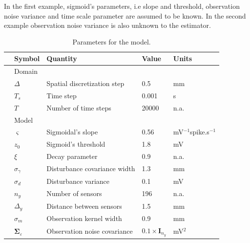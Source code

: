 \documentclass[10pt,twocolumn,twoside]{IEEEtran}
\begin{document}
In the first example, sigmoid's parameters, i.e slope and threshold, observation noise variance and time scale parameter are assumed to be known. In the second example observation noise variance is also unknown to the estimator.

\begin {table}[t]
\begin{center}
	{\tiny\begin{tabular}{lllll}
	\hline \hline
	& Symbol & Quantity &Value& Units\\ 
	\hline 
	& Domain&&& \\
	& $\Delta$ &Spatial discretization step&0.5&mm \\ 
 	& $T_s$ &Time step&0.001&s \\ 
 	& $T$ &Number of time steps&20000&n.a. \\ 
 	&Model&&& \\
 	& $\varsigma$ &Sigmoidal's slope&0.56&mV$^{-1}$spike.s$^{-1}$ \\ 
 	& $z_0$ &Sigmoid's threshold &1.8&mV \\ 
 	& $\xi$ &Decay parameter&0.9 &n.a. \\  
  & $\sigma_{\gamma}$ &Disturbance covariance width&1.3 &mm \\  
  & $\sigma_{d}$ &Disturbance variance&0.1 &mV \\  
  & $n_{y}$ &Number of sensors&196 &n.a. \\  
  & $\Delta_{y}$ &Distance between sensors&1.5 &mm \\  
  & $\sigma_{m}$ &Observation kernel width&0.9 &mm \\  
  & $\boldsymbol\Sigma_{\varepsilon}$ &Observation noise covariance&$0.1\times\mathbf{I}_{n_y}$ &mV$^2$ \\  
 	\hline \hline
	\end{tabular}}
 \caption {Parameters for the model. } 
 \label{table:SimulationParameters}
 \end{center}
 \end {table}
\end{document}
